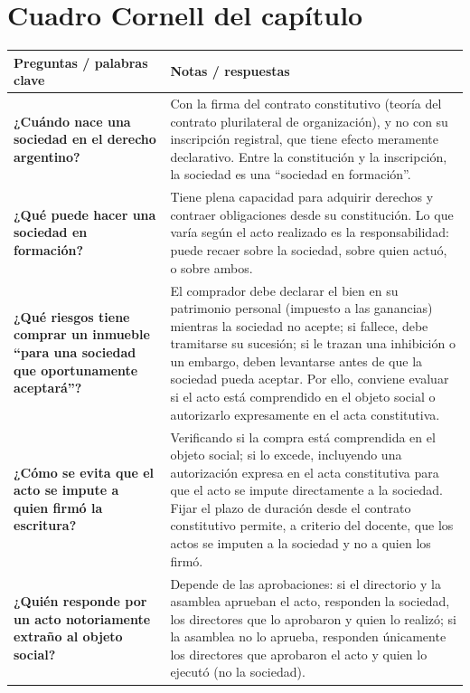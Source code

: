 \documentclass[12pt,oneside]{book}
\newlength{\cornellL}
\newlength{\cornellR}
\newcommand{\cornellrow}[2]{\textbf{#1} & #2 \\[0.3em] \midrule[0.3pt]}
\begin{document}
\section{Cuadro Cornell del capítulo}

\begingroup
\renewcommand{\arraystretch}{1.25}
\begin{longtable}{@{}>{\RaggedRight\arraybackslash}p{\cornellL}>{\RaggedRight\arraybackslash}p{\cornellR}@{}}
\toprule
\textbf{Preguntas / palabras clave} & \textbf{Notas / respuestas} \\
\midrule
\endhead

\cornellrow{¿Cuándo nace una sociedad en el derecho argentino?}{Con la firma del contrato constitutivo (teoría del contrato plurilateral de organización), y no con su inscripción registral, que tiene efecto meramente declarativo. Entre la constitución y la inscripción, la sociedad es una ``sociedad en formación''.}

\cornellrow{¿Qué puede hacer una sociedad en formación?}{Tiene plena capacidad para adquirir derechos y contraer obligaciones desde su constitución. Lo que varía según el acto realizado es la responsabilidad: puede recaer sobre la sociedad, sobre quien actuó, o sobre ambos.}

\cornellrow{¿Qué riesgos tiene comprar un inmueble ``para una sociedad que oportunamente aceptará''?}{El comprador debe declarar el bien en su patrimonio personal (impuesto a las ganancias) mientras la sociedad no acepte; si fallece, debe tramitarse su sucesión; si le trazan una inhibición o un embargo, deben levantarse antes de que la sociedad pueda aceptar. Por ello, conviene evaluar si el acto está comprendido en el objeto social o autorizarlo expresamente en el acta constitutiva.}

\cornellrow{¿Cómo se evita que el acto se impute a quien firmó la escritura?}{Verificando si la compra está comprendida en el objeto social; si lo excede, incluyendo una autorización expresa en el acta constitutiva para que el acto se impute directamente a la sociedad. Fijar el plazo de duración desde el contrato constitutivo permite, a criterio del docente, que los actos se imputen a la sociedad y no a quien los firmó.}

\cornellrow{¿Quién responde por un acto notoriamente extraño al objeto social?}{Depende de las aprobaciones: si el directorio y la asamblea aprueban el acto, responden la sociedad, los directores que lo aprobaron y quien lo realizó; si la asamblea no lo aprueba, responden únicamente los directores que aprobaron el acto y quien lo ejecutó (no la sociedad).}


\end{longtable}
\end{document}
